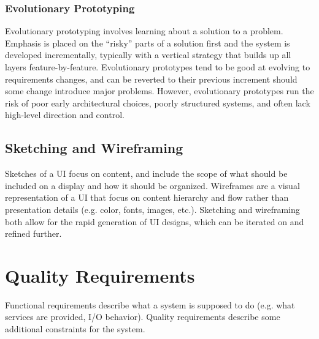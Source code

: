 \documentclass[12pt,titlepage]{article}
\begin{document}
      \subsubsection{Evolutionary Prototyping}
        Evolutionary prototyping involves learning about a solution to a problem. Emphasis is placed on the ``risky'' parts of a solution first and the system is developed incrementally,
        typically with a vertical strategy that builds up all layers feature-by-feature. Evolutionary prototypes tend to be good at evolving to requirements changes, and can be
        reverted to their previous increment should some change introduce major problems. However, evolutionary prototypes run the risk of poor early architectural choices, poorly
        structured systems, and often lack high-level direction and control.

      \subsection{Sketching and Wireframing}
        Sketches of a UI focus on content, and include the scope of what should be included on a display and how it should be organized. Wireframes are a visual representation of a UI
        that focus on content hierarchy and flow rather than presentation details (e.g. color, fonts, images, etc.). Sketching and wireframing both allow for the rapid generation of
        UI designs, which can be iterated on and refined further.

  \newpage

  \section{Quality Requirements}
    Functional requirements describe what a system is supposed to do (e.g. what services are provided, I/O behavior). Quality requirements describe some
    additional constraints for the system.
\end{document}
